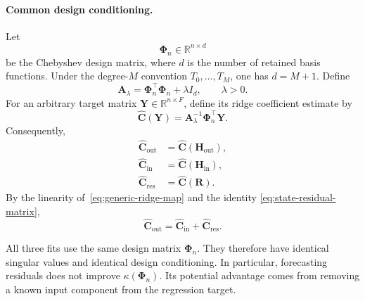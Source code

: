 \paragraph{Common design conditioning.}
Let
\begin{equation}
\mathbf{\Phi}_n\in\mathbb{R}^{n\times d}
\end{equation}
be the Chebyshev design matrix, where $d$ is the number of retained
basis functions. Under the degree-$M$ convention
$T_0,\ldots,T_M$, one has $d=M+1$. Define
\begin{equation}
\mathbf{A}_\lambda
=
\mathbf{\Phi}_n^\top\mathbf{\Phi}_n+\lambda I_d,
\qquad
\lambda>0.
\label{eq:residual-ridge-matrix}
\end{equation}
For an arbitrary target matrix
$\mathbf{Y}\in\mathbb{R}^{n\times F}$, define its ridge coefficient
estimate by
\begin{equation}
\widehat{\mathbf{C}}(\mathbf{Y})
=
\mathbf{A}_\lambda^{-1}
\mathbf{\Phi}_n^\top\mathbf{Y}.
\label{eq:generic-ridge-map}
\end{equation}
Consequently,
\begin{align}
\widehat{\mathbf{C}}_{\mathrm{out}}
&=
\widehat{\mathbf{C}}
\left(
\mathbf{H}_{\mathrm{out}}
\right),
\\
\widehat{\mathbf{C}}_{\mathrm{in}}
&=
\widehat{\mathbf{C}}
\left(
\mathbf{H}_{\mathrm{in}}
\right),
\\
\widehat{\mathbf{C}}_{\mathrm{res}}
&=
\widehat{\mathbf{C}}
\left(
\mathbf{R}
\right).
\end{align}
By the linearity of~\eqref{eq:generic-ridge-map} and the identity
\eqref{eq:state-residual-matrix},
\begin{equation}
\widehat{\mathbf{C}}_{\mathrm{out}}
=
\widehat{\mathbf{C}}_{\mathrm{in}}
+
\widehat{\mathbf{C}}_{\mathrm{res}}.
\label{eq:ridge-coefficient-decomposition}
\end{equation}

All three fits use the same design matrix $\mathbf{\Phi}_n$. They
therefore have identical singular values and identical design
conditioning. In particular, forecasting residuals does not improve
$\kappa(\mathbf{\Phi}_n)$. Its potential advantage comes from removing
a known input component from the regression target.

